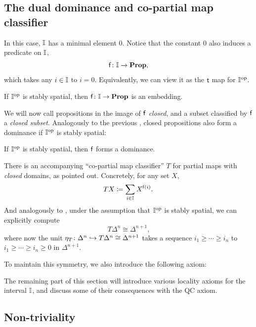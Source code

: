 \subsection{The dual dominance and co-partial map classifier}

In this case, $\mathbb{I}$ has a minimal element $0$. Notice that the constant $0$ also induces a predicate on $\mathbb{I}$,
\[ \mathsf{f}\colon \mathbb{I} \to \mathbf{Prop}\text{,} \]
which takes any $i \in \mathbb{I}$ to $i = 0$. Equivalently, we can view it as the $\mathsf{t}$ map for $\mathbb{I}^{\mathrm{op}}$.

\begin{corollary}
  If $\mathbb{I}^{\mathrm{op}}$ is stably spatial, then $\mathsf{f}\colon \mathbb{I} \to \mathbf{Prop}$ is an embedding.
\end{corollary}

We will now call propositions in the image of $\mathsf{f}$ \emph{closed}, and a subset classified by $\mathsf{f}$ a \emph{closed subset}. Analogously to the previous , closed propositions also form a dominance if $\mathbb{I}^{\mathrm{op}}$ is stably spatial:

\begin{corollary}\label{cor:dualisdominance}
  If $\mathbb{I}^{\mathrm{op}}$ is stably spatial, then $\mathsf{f}$ forms a dominance.
\end{corollary}

There is an accompanying ``co-partial map classifier'' $T$ for partial maps with \emph{closed} domains, as \citet{hyland_first_2006} pointed out. Concretely, for any set $X$,
\[ T X \coloneq \sum_{i \in \mathbb{I}} X^{\mathsf{f}(i)}\text{.} \]
And analogously to , under the assumption that $\mathbb{I}^{\mathrm{op}}$ is stably spatial, we can explicitly compute 
\[ T\Delta^n \cong \Delta^{n+1}\text{,} \]
where now the unit $\eta_T \colon \Delta^n \hookrightarrow T\Delta^n \cong \Delta^{n+1}$ takes a sequence $i_1 \ge \cdots \ge i_n$ to $i_1 \ge \cdots \ge i_n \ge 0$ in $\Delta^{n+1}$. 

To maintain this symmetry, we also introduce the following axiom:

\PrintAxiomSQCID

The remaining part of this section will introduce various locality axioms for the interval $\mathbb{I}$, and discuss some of their consequences with the \gls{QC} axiom.

\subsection{Non-triviality}

